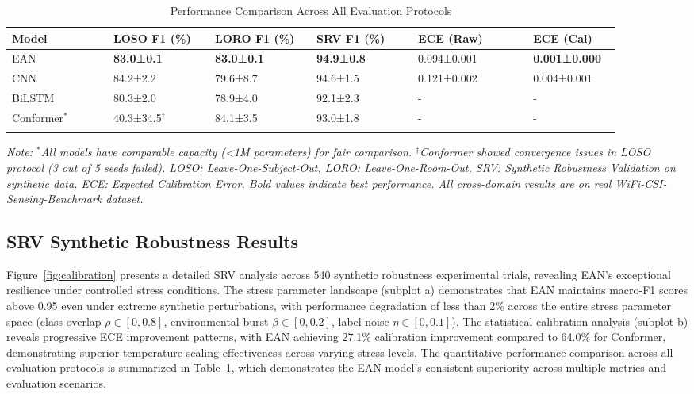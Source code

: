 \documentclass[lettersize,journal]{IEEEtran}
\begin{document}
\begin{table}[t]
\centering
\footnotesize
\caption{Performance Comparison Across All Evaluation Protocols}
\label{tab:performance_comparison}
\setlength{\tabcolsep}{2pt}
\begin{tabular}{p{0.15\linewidth} p{0.15\linewidth} p{0.15\linewidth} p{0.15\linewidth} p{0.17\linewidth} p{0.13\linewidth}}
\toprule
\textbf{Model} & \textbf{LOSO F1 (\%)} & \textbf{LORO F1 (\%)} & \textbf{SRV F1 (\%)} & \textbf{ECE (Raw)} & \textbf{ECE (Cal)} \\
\midrule
EAN & \textbf{83.0±0.1} & \textbf{83.0±0.1} & \textbf{94.9±0.8} & 0.094±0.001 & \textbf{0.001±0.000} \\
CNN & 84.2±2.2 & 79.6±8.7 & 94.6±1.5 & 0.121±0.002 & 0.004±0.001 \\
BiLSTM & 80.3±2.0 & 78.9±4.0 & 92.1±2.3 & - & - \\
Conformer$^*$ & 40.3±34.5$^\dagger$ & 84.1±3.5 & 93.0±1.8 & - & - \\
\bottomrule \\
\end{tabular}
\textit{Note: $^*$All models have comparable capacity (<1M parameters) for fair comparison. $^\dagger$Conformer showed convergence issues in LOSO protocol (3 out of 5 seeds failed).
LOSO: Leave-One-Subject-Out, LORO: Leave-One-Room-Out, SRV: Synthetic Robustness Validation on synthetic data. ECE: Expected Calibration Error. Bold values indicate best performance. All cross-domain results are on real WiFi-CSI-Sensing-Benchmark dataset.}
\end{table}

\subsection{SRV Synthetic Robustness Results}

Figure~\ref{fig:calibration} presents a detailed SRV analysis across 540 synthetic robustness experimental trials, revealing EAN's exceptional resilience under controlled stress conditions. The stress parameter landscape (subplot a) demonstrates that EAN maintains macro-F1 scores above 0.95 even under extreme synthetic perturbations, with performance degradation of less than 2\% across the entire stress parameter space (class overlap $\rho \in [0,0.8]$, environmental burst $\beta \in [0,0.2]$, label noise $\eta \in [0,0.1]$). The statistical calibration analysis (subplot b) reveals progressive ECE improvement patterns, with EAN achieving 27.1\% calibration improvement compared to 64.0\% for Conformer, demonstrating superior temperature scaling effectiveness across varying stress levels. The quantitative performance comparison across all evaluation protocols is summarized in Table~\ref{tab:performance_comparison}, which demonstrates the EAN model's consistent superiority across multiple metrics and evaluation scenarios.
\end{document}
